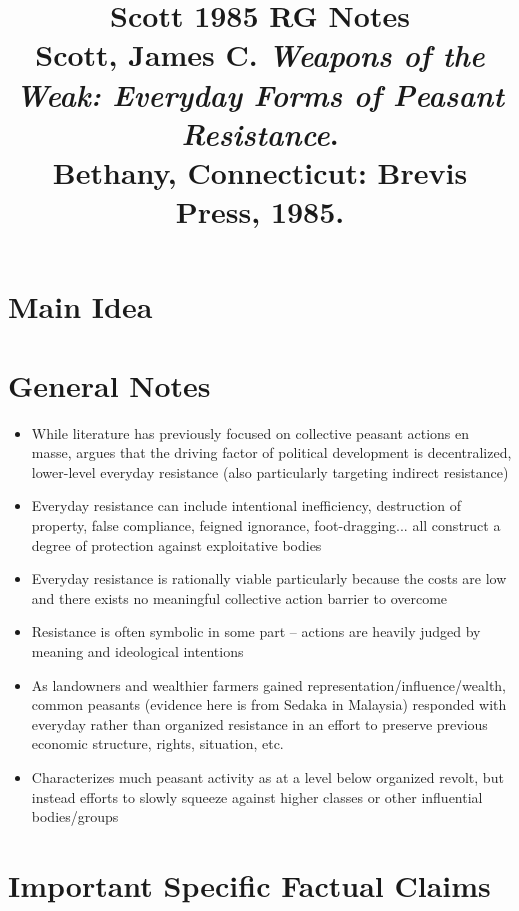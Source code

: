 \documentclass[12pt]{article}
\title{\textbf{Scott 1985 RG Notes}\\
\large Scott, James C. \textit{Weapons of the Weak: Everyday Forms of Peasant Resistance}.\\
Bethany, Connecticut: Brevis Press, 1985.}
\author{}
\date{}
\begin{document}
\maketitle

\section{Main Idea}



\section{General Notes}

\begin{itemize}[leftmargin=*, itemsep=4pt]
    \item While literature has previously focused on collective peasant actions en masse, argues that the driving factor of political development is decentralized, lower-level everyday resistance (also particularly targeting indirect resistance)
    \item Everyday resistance can include intentional inefficiency, destruction of property, false compliance, feigned ignorance, foot-dragging... all construct a degree of protection against exploitative bodies
    \item Everyday resistance is rationally viable particularly because the costs are low and there exists no meaningful collective action barrier to overcome
    \item Resistance is often symbolic in some part -- actions are heavily judged by meaning and ideological intentions
    \item As landowners and wealthier farmers gained representation/influence/wealth, common peasants (evidence here is from Sedaka in Malaysia) responded with everyday rather than organized resistance in an effort to preserve previous economic structure, rights, situation, etc.
    \item Characterizes much peasant activity as at a level below organized revolt, but instead efforts to slowly squeeze against higher classes or other influential bodies/groups
\end{itemize}


\section{Important Specific Factual Claims}
\end{document}
